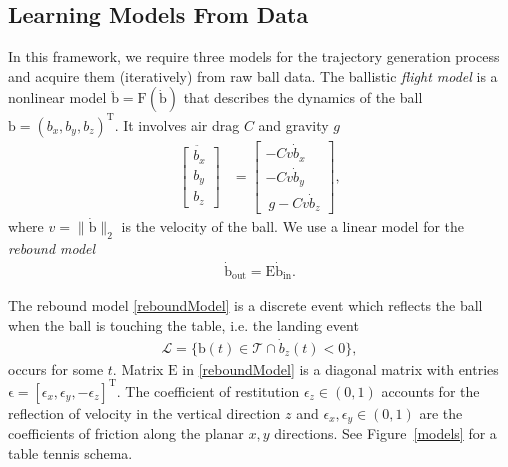 \documentclass[letterpaper, 10 pt, conference]{ieeeconf}
\newcommand{\boldvec}[1]{\boldsymbol{\mathrm{#1}}}
\let\vec\boldvec
\newcommand{\ballFull}{\vec{x}_{B}} %
\newcommand{\ball}{\vec{b}} %
\newcommand{\ballRadius}{r_B}
\newcommand{\ballVel}{v}
\newcommand{\ballDynamics}{\vec{F}} %
\newcommand{\drag}{C} %
\newcommand{\gravity}{g}
\newcommand{\bounce}{\vec{E}}
\newcommand{\court}{\mathcal{T}} %
\newcommand{\landEvent}{\mathcal{L}} %
\begin{document}


\subsection{Learning Models From Data}

In this framework, we require three models for the trajectory generation process and acquire them (iteratively) from raw ball data. The ballistic \emph{flight model} is a nonlinear model $\ddot{\ball} = \ballDynamics(\dot{\ball})$ that describes the dynamics of the ball $\ball = (b_x,b_y,b_z)^{\mathrm{T}}$. It involves air drag $\drag$ and gravity $\gravity$
%
\begin{align}
\ddot{\begin{bmatrix}
   b_x \\
   b_y \\
   b_z   
 \end{bmatrix}} &= 
 \begin{bmatrix}
 -\drag \ballVel \dot{b}_x  \\
 -\drag \ballVel \dot{b}_y  \\
 \ \gravity - \drag \ballVel \dot{b}_z 
 \end{bmatrix},
\label{flightModel}
\end{align}
%
\noindent where $\ballVel = \|\dot{\ball}\|_2$ is the velocity of the ball. We use a linear model for the \emph{rebound model}
%
\begin{align}
\dot{\ball}_{\mathrm{out}} = \bounce\dot{\ball}_{\mathrm{in}}.
\label{reboundModel}
\end{align}

\noindent The rebound model \eqref{reboundModel} is a discrete event which reflects the ball when the ball is touching the table, i.e. the landing event
%
\begin{align}
\landEvent = \{\ball(t) \in \court \cap \dot{b}_z(t) < 0\},
\label{landingEvent}
\end{align}
%
%
\noindent occurs for some $t$. Matrix $\bounce$ in \eqref{reboundModel} is a diagonal matrix with entries $\vec{\epsilon} = [\epsilon_{x}, \epsilon_{y}, -\epsilon_{z}]^{\mathrm{T}}$. The coefficient of restitution $\epsilon_{z} \in (0,1)$ accounts for the reflection of velocity in the vertical direction $z$ and $\epsilon_{x}, \epsilon_{y} \in (0,1)$ are the coefficients of friction along the planar $x,y$ directions. See Figure~\ref{models} for a table tennis schema. 
\end{document}
